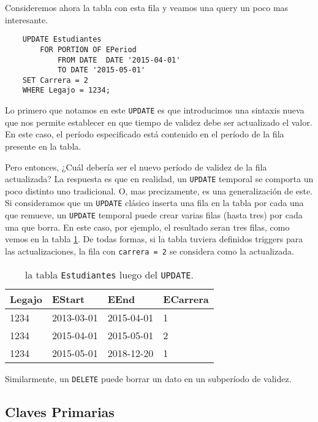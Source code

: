 Consideremos ahora la tabla con esta fila y veamos una query un poco mas interesante.

\begin{verbatim}
    UPDATE Estudiantes
        FOR PORTION OF EPeriod
            FROM DATE  DATE '2015-04-01'
            TO DATE '2015-05-01'
    SET Carrera = 2
    WHERE Legajo = 1234;
\end{verbatim}

Lo primero que notamos en este \texttt{UPDATE} es que introducimos una sintaxis nueva que nos permite establecer
en que tiempo de validez debe ser actualizado el valor.
En este caso, el período especificado está contenido en el período de la fila presente en la tabla.

Pero entonces, ¿Cuál debería ser el nuevo período de validez de la fila actualizada?
La respuesta es que en realidad, un \texttt{UPDATE} temporal se comporta un poco distinto uno tradicional.
O, mas precizamente, es una generalización de este.
Si consideramos que un \texttt{UPDATE} clásico inserta una fila en la tabla por cada una que remueve,
un \texttt{UPDATE} temporal puede crear varias filas (hasta tres) por cada una que borra.
En este caso, por ejemplo, el resultado seran tres filas, como vemos en la tabla \ref{tab:update}.
De todas formas, si la tabla tuviera definidos triggers para las actualizaciones,
la fila con \texttt{carrera = 2} se considera como la actualizada.

\begin{table}[]
    \center \begin{tabular}{l|l|l|l}
    Legajo & EStart     & EEnd       & ECarrera \\ \hline
    1234   & 2013-03-01 & 2015-04-01 & 1        \\
    1234   & 2015-04-01 & 2015-05-01 & 2        \\
    1234   & 2015-05-01 & 2018-12-20 & 1
    \end{tabular}
    \caption{la tabla \texttt{Estudiantes} luego del \texttt{UPDATE}.}
    \label{tab:update}
\end{table}

Similarmente, un \texttt{DELETE} puede borrar un dato en un subperíodo de validez.

\subsection{Claves Primarias}

